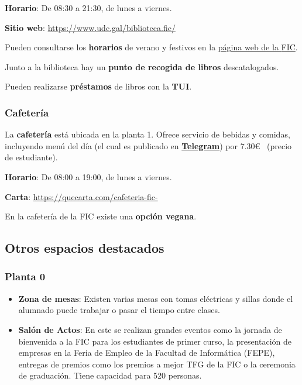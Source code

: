 \textbf{Horario}: De 08:30 a 21:30, de lunes a viernes.

\textbf{Sitio web}: \url{https://www.udc.gal/biblioteca.fic/}

\begin{infoBox}
    Pueden consultarse los \textbf{horarios} de verano y festivos en la \href{https://www.fic.udc.es/gl/biblioteca-0}{página web de la \acrshort{FIC}}.
\end{infoBox}

\begin{curiosityBox}
    Junto a la biblioteca hay un \textbf{punto de recogida de libros} descatalogados.
\end{curiosityBox}

\begin{rememberBox}
    Pueden realizarse \textbf{préstamos} de libros con la \textbf{\acrshort{TUI}}. 
\end{rememberBox}

\subsubsection{Cafetería}

La \textbf{cafetería} está ubicada en la planta 1. Ofrece servicio de bebidas y comidas, incluyendo menú del día (el cual es publicado en \href{https://t.me/CafeteriaFIC}{\textbf{Telegram}}) por 7.30\euro~ (precio de estudiante).

\textbf{Horario}: De 08:00 a 19:00, de lunes a viernes.

\textbf{Carta}: \url{https://quecarta.com/cafeteria-fic-}

\begin{curiosityBox}
    En la cafetería de la \acrshort{FIC} existe una \textbf{opción vegana}.
\end{curiosityBox}

\subsection{Otros espacios destacados}

\subsubsection{Planta 0}

\begin{itemize}
    \item \textbf{Zona de mesas}: Existen varias mesas con tomas eléctricas y sillas donde el alumnado puede trabajar o pasar el tiempo entre clases.

    \item \textbf{Salón de Actos}: En este se realizan grandes eventos como la jornada de bienvenida a la \acrshort{FIC} para los estudiantes de primer curso, la presentación de empresas en la Feria de Empleo de la Facultad de Informática (\acrshort{FEPE}), entregas de premios como los premios a mejor \acrlong{TFG} de la \acrshort{FIC} o la ceremonia de graduación. Tiene capacidad para 520 personas.
\end{itemize}

